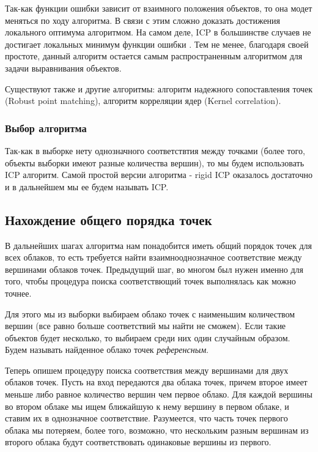 Так-как функции ошибки зависит от взаимного положения объектов, то она модет меняться по ходу алгоритма. В связи с этим сложно доказать достижения локального оптимума алгоритмом. На самом деле, ICP в большинстве случаев не достигает локальных минимум функции ошибки \cite{icp-non-min}. Тем не менее, благодаря своей простоте, данный алгоритм остается самым распространенным алгоритмом для задачи выравнивания объектов.

Существуют также и другие алгоритмы: алгоритм надежного сопоставления точек (Robust point matching), алгоритм корреляции ядер (Kernel correlation).



\subsubsection{Выбор алгоритма}
Так-как в выборке нету однозначного соответствтия между точками (более того, объекты выборки имеют разные количества вершин), то мы будем использовать ICP алгоритм. Самой простой версии алгоритма - rigid ICP оказалось достаточно и в дальнейшем мы ее будем называть ICP.


\subsection{Нахождение общего порядка точек}

В дальнейших шагах алгоритма нам понадобится иметь общий порядок точек для всех облаков, то есть требуется найти взаимнооднозначное соответствие между вершинами облаков точек. Предыдущий шаг, во многом был нужен именно для того, чтобы процедура поиска соответствющий точек выполнялась как можно точнее. 


Для этого мы из выборки выбираем  облако точек с наименьшим количеством вершин (все равно больше соответствий мы найти не сможем). Если такие объектов будет несколько, то выбираем среди них один случайным образом. Будем называть найденное облако точек \textit{референсным}.


Теперь опишем процедуру поиска соответствия между вершинами для двух облаков точек. Пусть на вход передаются два облака точек, причем второе имеет меньше либо равное количество вершин чем первое облако. Для каждой вершины во втором облаке мы ищем ближайшую к нему вершину в первом облаке, и ставим их в однозначное соответствие. Разумеется, что часть точек первого облака мы потеряем, более того, возможно, что нескольким разным вершинам из второго облака будут соответствовать одинаковые вершины из первого.


